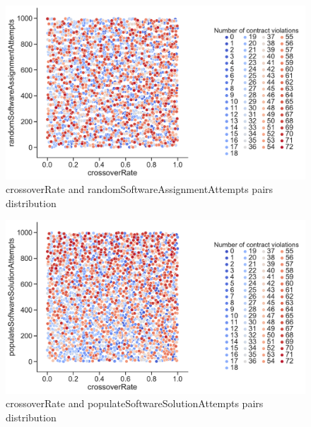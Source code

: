 \begin{figure}
	\centering
	\includegraphics[width=\textwidth]{images/PairsDistr/crossoverRate_randomSoftwareAssignmentAttempts.pdf}
	\caption[crossoverRate and randomSoftwareAssignmentAttempts pairs distribution]{crossoverRate and randomSoftwareAssignmentAttempts pairs distribution}
	\label{fig:crossoverRate_randomSoftwareAssignmentAttempts_pair}
\end{figure}
\begin{figure}
	\centering
	\includegraphics[width=\textwidth]{images/PairsDistr/crossoverRate_populateSoftwareSolutionAttempts.pdf}
	\caption[crossoverRate and populateSoftwareSolutionAttempts pairs distribution]{crossoverRate and populateSoftwareSolutionAttempts pairs distribution}
	\label{fig:crossoverRate_populateSoftwareSolutionAttempts_pair}
\end{figure}
